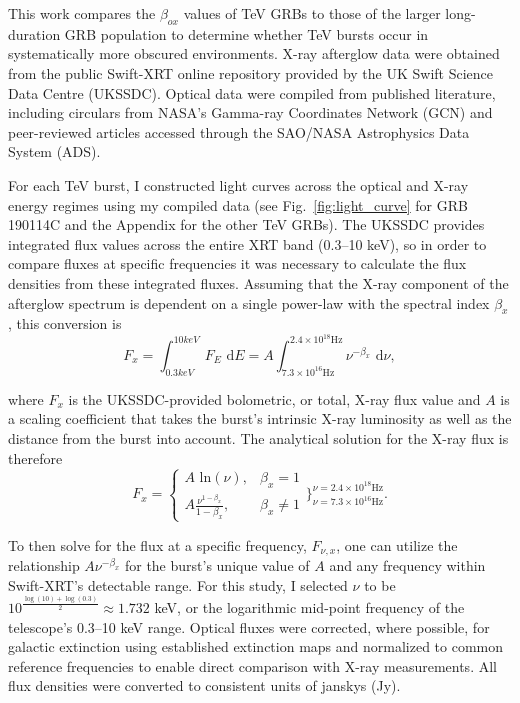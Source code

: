 \documentclass{article}
\begin{document}
This work compares the $\beta_{ox}$ values of TeV GRBs to those of the larger long-duration GRB population to determine whether TeV bursts occur in systematically more obscured environments. X-ray afterglow data were obtained from the public Swift-XRT online repository provided by the UK Swift Science Data Centre (UKSSDC). Optical data were compiled from published literature, including circulars from NASA's Gamma-ray Coordinates Network (GCN) and peer-reviewed articles accessed through the SAO/NASA Astrophysics Data System (ADS).

For each TeV burst, I constructed light curves across the optical and X-ray energy regimes using my compiled data (see Fig.~\ref{fig:light_curve} for GRB 190114C and the Appendix for the other TeV GRBs). The UKSSDC provides integrated flux values across the entire XRT band (0.3--10 keV), so in order to compare fluxes at specific frequencies it was necessary to calculate the flux densities from these integrated fluxes. Assuming that the X-ray component of the afterglow spectrum is dependent on a single power-law with the spectral index $\beta_x$, this conversion is
\[
F_x = \int^{10 keV}_{0.3 keV} F_E \text{ d}E = A\int^{2.4 \times 10^{18} \text{Hz}}_{7.3 \times 10^{16} \text{Hz}} \nu^{-\beta_x} \text{ d} \nu,
\]

\noindent where $F_x$ is the UKSSDC-provided bolometric, or total, X-ray flux value and $A$ is a scaling coefficient that takes the burst's intrinsic X-ray luminosity as well as the distance from the burst into account. The analytical solution for the X-ray flux is therefore
\[
F_x =
\begin{cases}
    A\text{ ln}(\nu), & {\beta_x = 1} \\
    A \frac{\nu^{1-\beta_x}}{1-\beta_x}, & {\beta_x \neq 1}
\end{cases} 
\Biggl\}^{\nu = 2.4 \times 10^{18} \text{Hz}}_{\nu = 7.3 \times 10^{16} \text{Hz}} .
\]

To then solve for the flux at a specific frequency, $F_{\nu, x}$, one can utilize the relationship $A\nu^{-\beta_x}$ for the burst's unique value of $A$ and any frequency within Swift-XRT's detectable range. For this study, I selected $\nu$ to be $10^{\frac{\log(10) + \log(0.3)}{2}} \approx 1.732$ keV, or the logarithmic mid-point frequency of the telescope's 0.3--10 keV range. Optical fluxes were corrected, where possible, for galactic extinction using established extinction maps and normalized to common reference frequencies to enable direct comparison with X-ray measurements. All flux densities were converted to consistent units of janskys (Jy).
\end{document}
